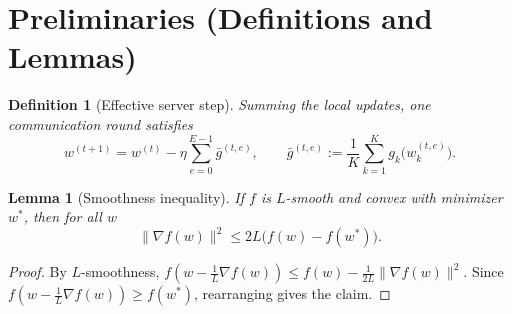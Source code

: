 \documentclass[11pt]{article}
\newtheorem{lemma}{Lemma}
\newtheorem{definition}{Definition}
\begin{document}
\section*{Preliminaries (Definitions and Lemmas)}

\begin{definition}[Effective server step]
Summing the local updates, one communication round satisfies
\[
w^{(t+1)} = w^{(t)} - \eta \sum_{e=0}^{E-1} \bar g^{(t,e)},
\qquad
\bar g^{(t,e)} := \frac{1}{K}\sum_{k=1}^{K} g_k\big(w_k^{(t,e)}\big).
\]
\end{definition}

\begin{lemma}[Smoothness inequality]\label{lem:smooth}
If $f$ is $L$-smooth and convex with minimizer $w^*$, then for all $w$
\[
\|\nabla f(w)\|^2 \le 2L\big(f(w)-f(w^*)\big).
\]
\end{lemma}
\begin{proof}
By $L$-smoothness, $f(w - \tfrac1L \nabla f(w)) \le f(w) - \tfrac{1}{2L}\|\nabla f(w)\|^2$.
Since $f(w-\tfrac1L\nabla f(w))\ge f(w^*)$, rearranging gives the claim.
\end{proof}
\end{document}
